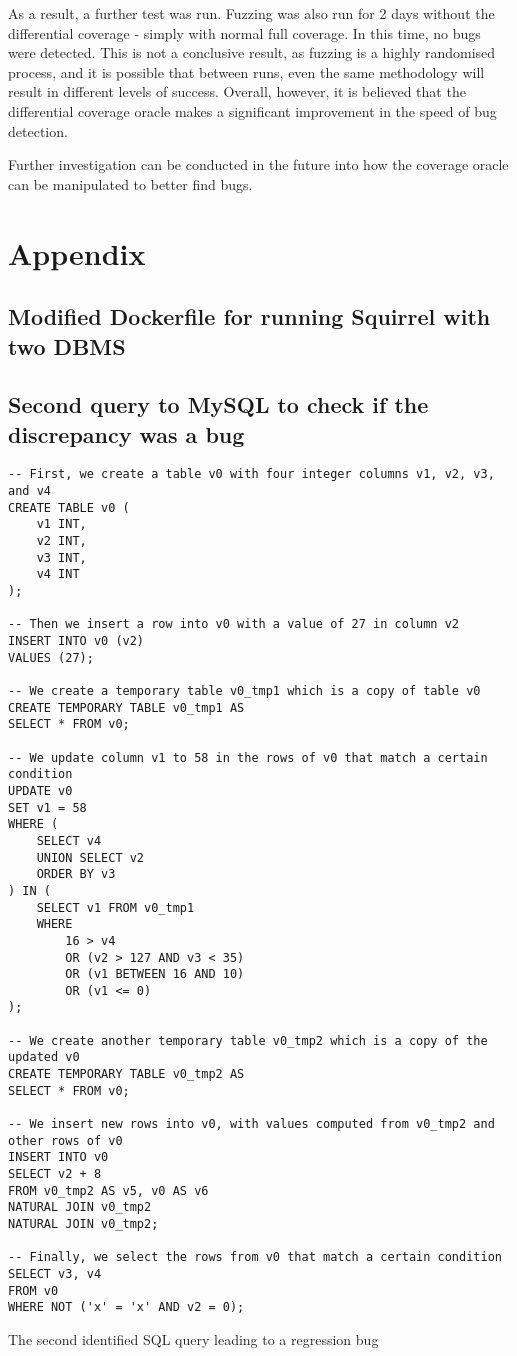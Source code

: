 \documentclass[sigconf]{acmart}
\begin{document}
As a result, a further test was run. Fuzzing was also run for 2 days without the differential coverage - simply with normal full coverage. In this time, no bugs were detected. This is not a conclusive result, as fuzzing is a highly randomised process, and it is possible that between runs, even the same methodology will result in different levels of success. Overall, however, it is believed that the differential coverage oracle makes a significant improvement in the speed of bug detection.

Further investigation can be conducted in the future into how the coverage oracle can be manipulated to better find bugs.



\printbibliography
\blinddocument
\clearpage
\section{Appendix}
\label{app:dockerfile}
\subsection{Modified Dockerfile for running Squirrel with two DBMS}

\subsection{Second query to MySQL to check if the discrepancy was a bug}
\begin{lstlisting}
-- First, we create a table v0 with four integer columns v1, v2, v3, and v4
CREATE TABLE v0 (
    v1 INT,
    v2 INT,
    v3 INT,
    v4 INT
);

-- Then we insert a row into v0 with a value of 27 in column v2
INSERT INTO v0 (v2) 
VALUES (27);

-- We create a temporary table v0_tmp1 which is a copy of table v0
CREATE TEMPORARY TABLE v0_tmp1 AS 
SELECT * FROM v0;

-- We update column v1 to 58 in the rows of v0 that match a certain condition
UPDATE v0 
SET v1 = 58 
WHERE (
    SELECT v4 
    UNION SELECT v2 
    ORDER BY v3
) IN (
    SELECT v1 FROM v0_tmp1 
    WHERE 
        16 > v4 
        OR (v2 > 127 AND v3 < 35) 
        OR (v1 BETWEEN 16 AND 10) 
        OR (v1 <= 0)
);

-- We create another temporary table v0_tmp2 which is a copy of the updated v0
CREATE TEMPORARY TABLE v0_tmp2 AS 
SELECT * FROM v0;

-- We insert new rows into v0, with values computed from v0_tmp2 and other rows of v0
INSERT INTO v0 
SELECT v2 + 8 
FROM v0_tmp2 AS v5, v0 AS v6 
NATURAL JOIN v0_tmp2 
NATURAL JOIN v0_tmp2;

-- Finally, we select the rows from v0 that match a certain condition
SELECT v3, v4 
FROM v0 
WHERE NOT ('x' = 'x' AND v2 = 0);
\end{lstlisting}
\caption{The second identified SQL query leading to a regression bug}
\label{fig:bug_2}
\end{document}

